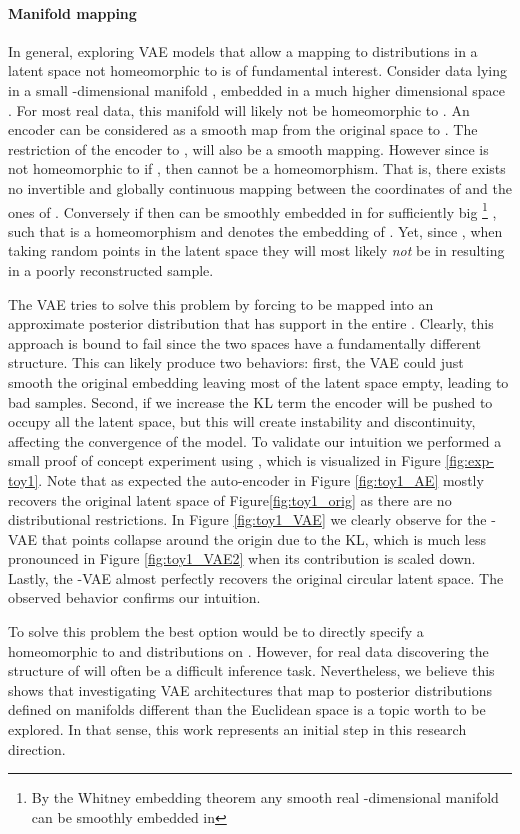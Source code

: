 \documentclass[letterpaper]{article}
\newcommand{\Sv}{}
\newcommand{\Nv}{}
\begin{document}
\paragraph{Manifold mapping}\label{par:manifold}
In general, exploring VAE models that allow a mapping to distributions in a latent space not homeomorphic to  is of fundamental interest. Consider data lying in a small -dimensional manifold , embedded in a much higher dimensional space . For most real data, this manifold will likely not be homeomorphic to . An encoder can be considered as a smooth map  from the original space to . The restriction of the encoder to ,  will also be a smooth mapping. However since  is not homeomorphic to  if , then  cannot be a homeomorphism. That is, there exists no invertible and globally continuous mapping between the coordinates of  and the ones of . Conversely if  then  can be smoothly embedded in  for  sufficiently big
\footnote{By the Whitney embedding theorem any smooth real -dimensional manifold can be smoothly embedded in }
, such that  is a homeomorphism and  denotes the embedding of . Yet, since , when taking random points in the latent space they will most likely \textit{not} be in  resulting in a poorly reconstructed sample. 
 
The VAE tries to solve this problem by forcing  to be mapped into an approximate posterior distribution that has support in the entire . Clearly, this approach is bound to fail since the two spaces have a fundamentally different structure. This can likely produce two behaviors: first, the VAE could just smooth the original embedding  leaving most of the latent space empty, leading to bad samples. Second, if we increase the KL term the encoder will be pushed to occupy all the latent space, but this will create instability and discontinuity, affecting the convergence of the model. To validate our intuition we performed a small proof of concept experiment using , which is visualized in Figure \ref{fig:exp-toy1}. Note that as expected the auto-encoder in Figure \ref{fig:toy1_AE} mostly recovers the original latent space of Figure\ref{fig:toy1_orig} as there are no distributional restrictions. In Figure \ref{fig:toy1_VAE} we clearly observe for the \Nv-VAE that points collapse around the origin due to the KL, which is much less pronounced in Figure \ref{fig:toy1_VAE2} when its contribution is scaled down. Lastly, the \Sv-VAE almost perfectly recovers the original circular latent space. The observed behavior confirms our intuition. 

To solve this problem the best option would be to directly specify a  homeomorphic to  and distributions on . However, for real data discovering the structure of  will often be a difficult inference task. Nevertheless, we believe this shows that investigating VAE architectures that map to posterior distributions defined on manifolds different than the Euclidean space is a topic worth to be explored. In that sense, this work represents an initial step in this research direction. 
\end{document}
